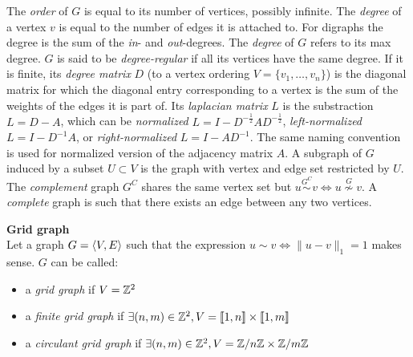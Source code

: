

The \emph{order} of $G$ is equal to its number of vertices, possibly infinite.
The \emph{degree} of a vertex $v$ is equal to the number of edges it is attached to.
For digraphs the degree is the sum of the \emph{in}- and \emph{out}-degrees.
The \emph{degree} of $G$ refers to its max degree.
$G$ is said to be \emph{degree-regular} if all its vertices have the same degree.
If it is finite, its \emph{degree matrix} $D$ (\wrt to a vertex ordering $V = \{v_1, \ldots, v_n\}$) is the diagonal matrix for which the diagonal entry corresponding to a vertex is the sum of the weights of the edges it is part of.
Its \emph{laplacian matrix} $L$ is the substraction $L = D-A$, which can be \emph{normalized} $L = I - D^{-\frac{1}2}AD^{-\frac{1}2}$, \emph{left-normalized} $L = I - D^{-1}A$, or \emph{right-normalized} $L = I - AD^{-1}$. The same naming convention is used for normalized version of the adjacency matrix $A$.
A subgraph of $G$ induced by a subset $U \subset V$ is the graph with vertex and edge set restricted by $U$. The \emph{complement} graph $G^C$ shares the same vertex set but $u \overset{G^C}\sim v \Leftrightarrow u \overset{G}\nsim v$.
A \emph{complete} graph is such that there exists an edge between any two vertices.

\begin{definition}\textbf{Grid graph}\\
Let a graph $G = \langle V, E \rangle$ such that the expression $u \sim v \Leftrightarrow \|u-v\|_1 = 1$ makes sense. $G$ can be called:
\begin{itemize}[nolistsep,noitemsep]
\item a \emph{grid graph} if $V = \mathbb{Z}^2$
\item a \emph{finite grid graph} if $\exists (n,m) \in \mathbb{Z}^2, V = \llbracket 1, n \rrbracket \times \llbracket 1, m \rrbracket$
\item a \emph{circulant grid graph} if $\exists (n,m) \in \mathbb{Z}^2, V = \mathbb{Z} /n \mathbb{Z} \times \mathbb{Z} /m \mathbb{Z}$
\end{itemize}
\end{definition}


